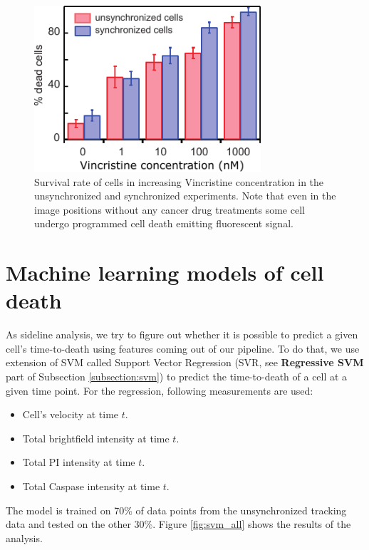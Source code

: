 \documentclass[pdftex,12pt,a4paper]{report}
\begin{document}
\begin{figure}[H]
\centering
\includegraphics[width=0.75\textwidth]{images/conc_effect/conc_effect.pdf}
\caption{Survival rate of cells in increasing Vincristine concentration in the unsynchronized and synchronized experiments. Note that even in the image positions without any cancer drug treatments some cell undergo programmed cell death emitting fluorescent signal.}
\label{fig:conc_effect}
\end{figure}

\section{Machine learning models of cell death}
\label{section:ml_results}

As sideline analysis, we try to figure out whether it is possible to predict a given cell's time-to-death using features coming out of our pipeline. To do that, we use extension of SVM called Support Vector Regression (SVR, see \textbf{Regressive SVM} part of Subsection \ref{subsection:svm}) to predict the time-to-death of a cell at a given time point. For the regression, following measurements are used:

\begin{itemize}
\item Cell's velocity at time $t$.
\item Total brightfield intensity at time $t$.
\item Total PI intensity at time $t$.
\item Total Caspase intensity at time $t$.
\end{itemize}

The model is trained on 70\% of data points from the unsynchronized tracking data and tested on the other 30\%. Figure \ref{fig:svm_all} shows the results of the analysis.
\end{document}
